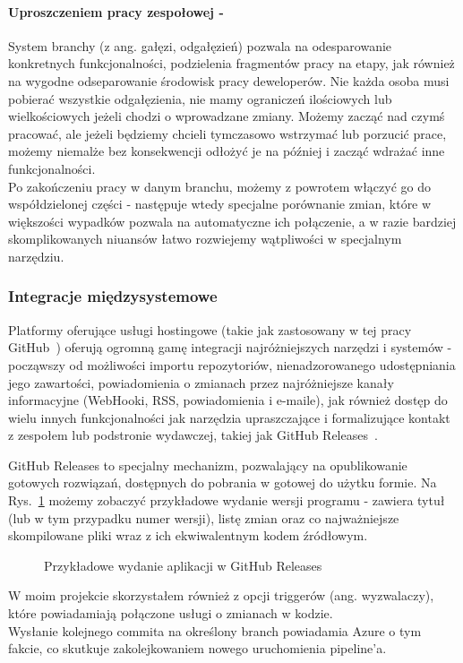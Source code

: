 \paragraph{Uproszczeniem pracy zespołowej -}
System branchy (z ang. gałęzi, odgałęzień) pozwala na odesparowanie konkretnych funkcjonalności, 
podzielenia fragmentów pracy na etapy, jak również na wygodne odseparowanie środowisk pracy deweloperów.
Nie każda osoba musi pobierać wszystkie odgałęzienia, nie mamy ograniczeń ilościowych lub wielkościowych 
jeżeli chodzi o wprowadzane zmiany. Możemy zacząć nad czymś pracować, ale jeżeli będziemy chcieli tymczasowo 
wstrzymać lub porzucić prace, możemy niemalże bez konsekwencji odłożyć je na później i zacząć wdrażać 
inne funkcjonalności.\\%
Po zakończeniu pracy w danym branchu, możemy z powrotem włączyć go do współdzielonej części - następuje 
wtedy specjalne porównanie zmian, które w większości wypadków pozwala na automatyczne ich połączenie, 
a w razie bardziej skomplikowanych niuansów łatwo rozwiejemy wątpliwości w specjalnym narzędziu.

\subsubsection{Integracje międzysystemowe}
Platformy oferujące usługi hostingowe (takie jak zastosowany w tej pracy GitHub~\cite{github}) oferują 
ogromną gamę integracji najróżniejszych narzędzi i systemów - począwszy od możliwości importu 
repozytoriów, nienadzorowanego udostępniania jego zawartości, powiadomienia o zmianach przez najróżniejsze 
kanały informacyjne (WebHooki, RSS, powiadomienia i e-maile), jak również dostęp do wielu innych 
funkcjonalności jak narzędzia upraszczające i formalizujące kontakt z zespołem 
lub podstronie wydawczej, takiej jak GitHub Releases~\cite{githubReleases}.

GitHub Releases to specjalny mechanizm, pozwalający na opublikowanie gotowych rozwiązań, dostępnych do 
pobrania w gotowej do użytku formie. Na Rys.~\ref{img:githubReleases_sample} możemy zobaczyć 
przykładowe wydanie wersji programu - zawiera tytuł (lub w tym przypadku numer wersji), listę zmian 
oraz co najważniejsze skompilowane pliki wraz z ich ekwiwalentnym kodem źródłowym.
\begin{figure}[ht]
    \centering
    \caption{Przykładowe wydanie aplikacji w GitHub Releases}
    \label{img:githubReleases_sample}
\end{figure}

W moim projekcie skorzystałem również z opcji triggerów (ang. wyzwalaczy), które powiadamiają 
połączone usługi o zmianach w kodzie. \\%
Wysłanie kolejnego commita na określony branch powiadamia 
Azure o tym fakcie, co skutkuje zakolejkowaniem nowego uruchomienia pipeline'a.